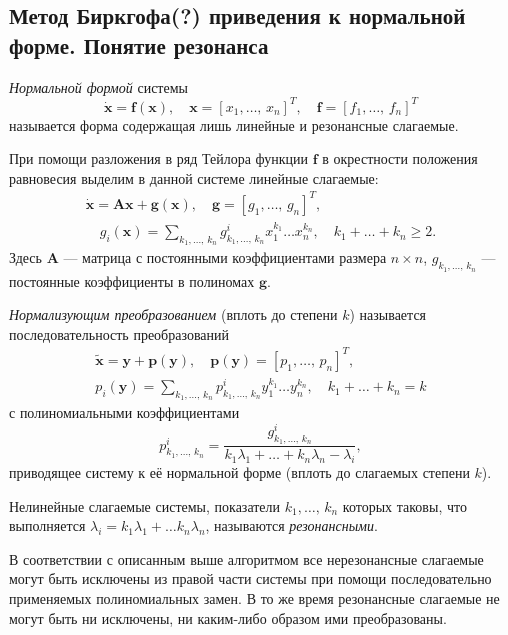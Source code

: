 \documentclass[a4paper]{article}
\begin{document}
\subsection{Метод Биркгофа(?) приведения к нормальной форме. Понятие резонанса}
\begin{dfn}
	\emph{Нормальной формой} системы
	\[
		\dot{\mathbf{x}}=\mathbf{f}(\mathbf{x}),\quad
		\mathbf{x}=[x_1,\ldots,\,x_n]^T, \quad 
		\mathbf{f}=[f_1,\ldots,\,f_n]^T
	\]
	называется форма содержащая лишь линейные и резонансные слагаемые.
\end{dfn}
При помощи разложения в ряд Тейлора функции   $\mathbf{f}$ в окрестности
положения равновесия выделим в данной системе линейные слагаемые:
\begin{gather*}
	\dot{\mathbf{x}}= \mathbf{Ax}+\boldsymbol{g}(\mathbf{x}),\quad
	\boldsymbol{g}=[g_1,\ldots,\,g_n]^T,\\ \quad g_i(\mathbf{x})=
	\sum_{k_1,\ldots,\,k_n}^{} g_{k_1,\ldots,\,k_n}^i x_1^{k_1}\ldots
	x_n ^{k_n},\quad k_1+\ldots+k_n \ge 2
.\end{gather*}
Здесь $\mathbf{A}$ --- матрица с постоянными коэффициентами размера $n \times n$,
$g_{k_1,\ldots,\,k_n}$ --- постоянные коэффициенты в полиномах $\boldsymbol{g}$.
\begin{dfn}
	\emph{Нормализующим преобразованием} (вплоть до степени $k$) 
	называется последовательность преобразований
	\begin{gather*}
		\tilde{\mathbf{x}}=\mathbf{y}+ \mathbf{p}(\mathbf{y}),\quad
		\mathbf{p}(\mathbf{y})=[p_1,\ldots,\,p_n]^T,\\
		p_i(\mathbf{y})= \sum_{k_1,\ldots,\,k_n}^{} p^i_{k_1,\ldots,\,k_n}
		y_1^{k_1}\ldots y_n^{k_n},\quad k_1+\ldots+k_n=k
	\end{gather*}
	с полиномиальными коэффициентами
	\[
	p_{k_1,\ldots,\,k_n}^i=\frac{g_{k_1,\ldots,\,k_n}^i}{k_1 \lambda_1+
	\ldots+k_n \lambda_n-\lambda_i}
	,\] 
	приводящее систему к её нормальной форме (вплоть до слагаемых степени
	$k$).
\end{dfn}
\begin{dfn}
	Нелинейные слагаемые системы, показатели $k_1,\ldots,\,k_n$ которых
	таковы, что выполняется $\lambda_i=k_1 \lambda_1+\ldots k_n \lambda_n$,
	называются \emph{резонансными}.
\end{dfn}
В соответствии с описанным выше алгоритмом все нерезонансные слагаемые могут
быть исключены из правой части системы при помощи последовательно применяемых
полиномиальных замен. В то же время резонансные слагаемые не могут быть ни
исключены, ни каким-либо образом ими преобразованы.
\end{document}
